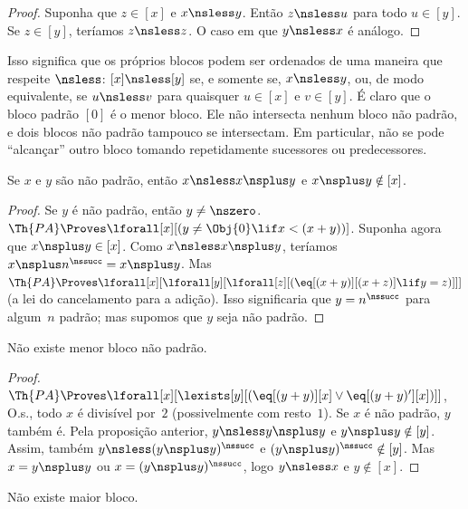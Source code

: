 \documentclass[../../../include/open-logic-section]{subfiles}
\begin{document}
\begin{proof}
Suponha que $z \in [x]$ e $x \nsless y$. Então $z \nsless u$ para
todo $u \in [y]$. Se $z \in [y]$, teríamos $z \nsless z$. O caso em
que $y \nsless x$ é análogo.
\end{proof}

\begin{explain}
Isso significa que os próprios blocos podem ser ordenados de uma
maneira que respeite $\nsless$: $[x] \nsless [y]$ se, e somente se,
$x \nsless y$, ou, de modo equivalente, se $u \nsless v$ para
quaisquer $u \in [x]$ e $v \in [y]$. É claro que o bloco padrão $[0]$
é o menor bloco. Ele não intersecta nenhum bloco não padrão, e dois
blocos não padrão tampouco se intersectam. Em particular, não se pode
``alcançar'' outro bloco tomando repetidamente sucessores ou
predecessores.
\end{explain}

\begin{prop}
Se $x$ e $y$ são não padrão, então $x \nsless x \nsplus y$ e
$x \nsplus y \notin [x]$.
\end{prop}

\begin{proof}
Se $y$ é não padrão, então $y \neq \nszero$. $\Th{PA} \Proves
\lforall[x][(y \neq \Obj{0} \lif x < (x+y))]$. Suponha agora que
$x \nsplus y \in [x]$. Como $x \nsless x \nsplus y$, teríamos
$x \nsplus n^\nssucc = x \nsplus y$. Mas $\Th{PA} \Proves
\lforall[x][\lforall[y][\lforall[z][(\eq[(x+y)][(x+z)] \lif y = z)]]]$
(a lei do cancelamento para a adição). Isso significaria que
$y = n^\nssucc$ para algum~$n$ padrão; mas supomos que $y$ seja não
padrão.
\end{proof}

\begin{prop}
Não existe menor bloco não padrão.
\end{prop}

\begin{proof}
$\Th{PA} \Proves \lforall[x][\lexists[y][(\eq[(y+y)][x] \lor
      \eq[(y+y)'][x])]]$, O.s.\@, todo $x$ é divisível por~$2$
  (possivelmente com resto~$1$). Se $x$ é não padrão, $y$ também é.
  Pela proposição anterior, $y \nsless y \nsplus y$ e $y \nsplus y
  \notin [y]$. Assim, também $y \nsless (y \nsplus y)^\nssucc$ e $(y
  \nsplus y)^\nssucc \notin [y]$. Mas $x = y \nsplus y$ ou $x = (y
  \nsplus y)^\nssucc$, logo $y \nsless x$ e $y \notin [x]$.
\end{proof}

\begin{prop}
Não existe maior bloco.
\end{prop}
\end{document}
